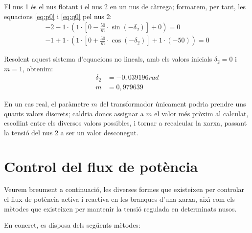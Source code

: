 \begin{exemple}
El nus 1 \'{e}s el nus flotant i el nus 2 en un nus de c\`{a}rrega;
formarem, per tant,  les equacions \eqref{eq:p0} i \eqref{eq:q0} pel
nus 2:
\begin{align*}
-2 - 1 \cdot\left( 1 \cdot\left[ 0 -\frac{50}{m} \cdot\sin(-\delta_2) \right]  + 0 \right)  = 0   \\[1.5ex]
-1 + 1 \cdot\left( 1 \cdot\left[0 + \frac{50}{m}
\cdot\cos(-\delta_2) \right]  + 1\cdot (-50) \right)  = 0
\end{align*}

Resolent aquest sistema d'equacions no lineals, amb els valors
inicials $\delta_2=0$ i $m=1$, obtenim:
\begin{align*}
   \delta_2 &= -0{,}039196\unit{rad} \\[1ex]
   m & =0{,}979639
\end{align*}

En un cas real, el par\`{a}metre $m$ del transformador \'{u}nicament podria
prendre uns quants valors discrets; caldria doncs assignar a $m$ el
valor m\'{e}s pr\`{o}xim al calculat, escollint entre els diversos valors
possibles, i tornar a recalcular la xarxa, passant la tensi\'{o} del nus
2 a ser un valor desconegut.

\end{exemple}

\section{Control del flux de pot\`{e}ncia} \label{sec:control-flux-pot}

Veurem breument a continuaci\'{o}, les diverses formes que existeixen
per controlar el flux de pot\`{e}ncia activa i reactiva en les branques
d'una xarxa, aix\'{\i} com els m\`{e}todes que existeixen per mantenir la
tensi\'{o} regulada en determinats nusos.

En concret, es disposa dels seg\"{u}ents m\`{e}todes:

